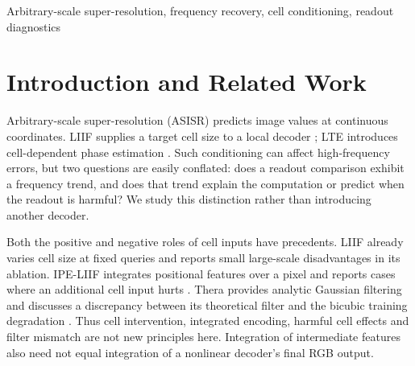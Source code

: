 \begin{abstract}
In arbitrary-scale super-resolution, cell inputs are often motivated
by the size of a target pixel, but frequency ordering alone does
not establish what this readout computes. We evaluate recovery in
low-resolution Nyquist units and distinguish paired training ablations
from fixed-weight cell interventions. Normalisation reduces cross-scale
variation in all nine primary model--dataset groups and all 27 groups
including additional seeds; the original strict collapse criterion still
fails. Fixing image weights reduces variation on Set14 but increases it
on Urban100: pooled consistency does not imply image-wise consistency.
Coarse readout-loss
ordering replicates in four architecture--seed groups, yet a footprint
score has exactly the ranks of band index and scale averaging fails
function similarity in every group. A separately calibrated,
observation-only forecast also misses harmful interventions and does
not improve on a magnitude/spectrum baseline. These results support a
frequency-based evaluation coordinate while delimiting the tested readout
interpretations and instance-level guidance.
\end{abstract}
\begin{keywords}
Arbitrary-scale super-resolution, frequency recovery, cell conditioning,
readout diagnostics
\end{keywords}

\section{Introduction and Related Work}
\label{sec:intro}
Arbitrary-scale super-resolution (ASISR) predicts image values at continuous
coordinates. LIIF supplies a target cell size to a local decoder
\cite{chen2021liif}; LTE introduces cell-dependent phase estimation
\cite{lee2022lte}. Such conditioning can affect high-frequency errors,
but two questions are easily conflated: does a readout comparison exhibit
a frequency trend, and does that trend explain the computation or predict
when the readout is harmful? We study this distinction rather than
introducing another decoder.

Both the positive and negative roles of cell inputs have precedents.
LIIF already varies cell size at fixed queries and reports small
large-scale disadvantages in its ablation. IPE-LIIF integrates positional
features over a pixel and reports cases where an additional cell input
hurts \cite{liu2021ipe}. Thera provides analytic Gaussian filtering and
discusses a discrepancy between its theoretical filter and the bicubic
training degradation \cite{becker2025thera}. Thus cell intervention,
integrated encoding, harmful cell effects and filter mismatch are not
new principles here. Integration of intermediate features also need
not equal integration of a nonlinear decoder's final RGB output.

